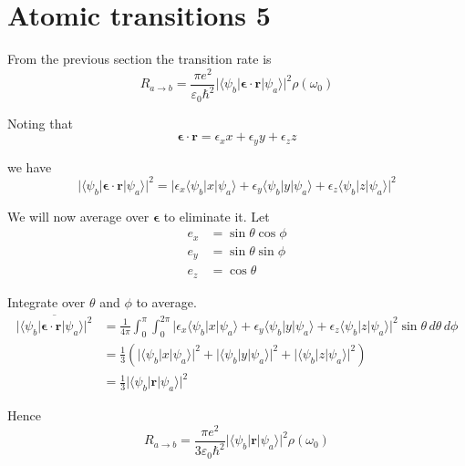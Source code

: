 

\section*{Atomic transitions 5}

From the previous section the transition rate is
\begin{equation*}
R_{a\rightarrow b}
=\frac{\pi e^2}{\varepsilon_0\hbar^2}
\bigl|\langle\psi_b|\boldsymbol{\epsilon}\cdot\mathbf r|\psi_a\rangle\bigr|^2
\rho(\omega_0)
\end{equation*}

Noting that
\begin{equation*}
\boldsymbol{\epsilon}\cdot\mathbf r=\epsilon_xx+\epsilon_yy+\epsilon_zz
\end{equation*}

we have
\begin{equation*}
\bigl|\langle\psi_b|\boldsymbol{\epsilon}\cdot\mathbf r|\psi_a\rangle\bigr|^2
=\bigl|
\epsilon_x\langle\psi_b|x|\psi_a\rangle
+\epsilon_y\langle\psi_b|y|\psi_a\rangle
+\epsilon_z\langle\psi_b|z|\psi_a\rangle
\bigr|^2
\end{equation*}

We will now average over $\boldsymbol\epsilon$ to eliminate it.
Let
\begin{align*}
e_x&=\sin\theta\cos\phi
\\
e_y&=\sin\theta\sin\phi
\\
e_z&=\cos\theta
\end{align*}

Integrate over $\theta$ and $\phi$ to average.
\begin{align*}
\overline{\bigl|\langle\psi_b|\boldsymbol{\epsilon}\cdot\mathbf r|\psi_a\rangle\bigr|^2}
&=\frac{1}{4\pi}\int_0^\pi\int_0^{2\pi}
\bigl|
\epsilon_x\langle\psi_b|x|\psi_a\rangle
+\epsilon_y\langle\psi_b|y|\psi_a\rangle
+\epsilon_z\langle\psi_b|z|\psi_a\rangle
\bigr|^2\sin\theta\,d\theta\,d\phi
\\
&=\frac{1}{3}\left(
\bigl|\langle\psi_b|x|\psi_a\rangle\bigr|^2
+\bigl|\langle\psi_b|y|\psi_a\rangle\bigr|^2
+\bigl|\langle\psi_b|z|\psi_a\rangle\bigr|^2
\right)
\\
&=\frac{1}{3}\bigl|\langle\psi_b|\mathbf r|\psi_a\rangle\bigr|^2
\tag{1}
\end{align*}

Hence
\begin{equation*}
R_{a\rightarrow b}
=\frac{\pi e^2}{3\varepsilon_0\hbar^2}
\bigl|\langle\psi_b|\mathbf r|\psi_a\rangle\bigr|^2
\rho(\omega_0)
\end{equation*}


